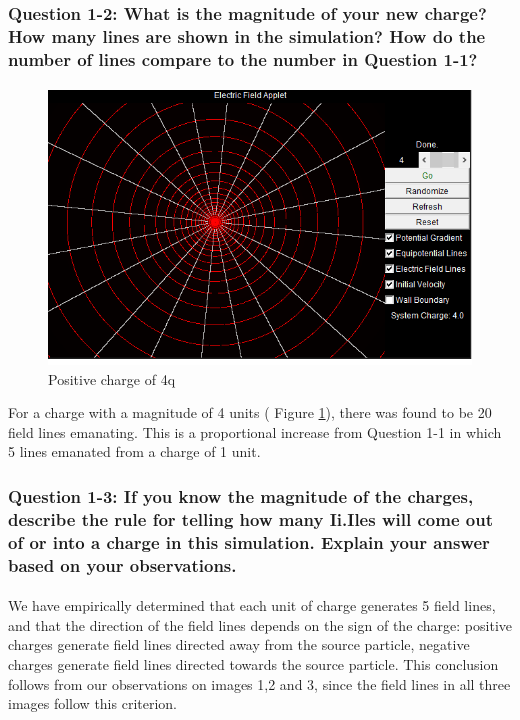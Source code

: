 \documentclass[oneside,12pt]{amsart}
\begin{document}
\subsubsection{Question 1-2: What is the magnitude of your new charge? How many lines are shown in the simulation? How do the number of lines compare to the number in Question 1-1?}
\paragraph{}

\begin{figure}[H]
	\includegraphics[width=\medgraph,scale=0.01]{BigPos.png}
	\caption{Positive charge of 4q} 
	\label{BigPos}
\end{figure}
For a charge with a magnitude of 4 units ( Figure \ref{BigPos}), there was found to be 20 field lines emanating. This is a proportional increase from Question 1-1 in which 5 lines emanated from a charge of 1 unit.


\subsubsection{ Question 1-3: If you know the magnitude of the charges, describe the rule for telling how many Ii.Iles will come out of or into a charge in this simulation. Explain your answer based on your observations.}
\paragraph{}
\indent We have empirically determined that each unit of charge generates 5 field lines, and that the direction of the field lines depends on the sign of the charge: positive charges generate field lines directed away from the source particle, negative charges generate field lines directed towards the source particle. This conclusion follows from our observations on images 1,2 and 3, since the field lines in all three images follow this criterion.
\newpage
\end{document}
